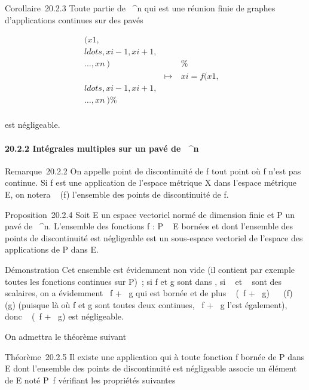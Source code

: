 Corollaire~20.2.3 Toute partie de ~^n qui est une réunion
finie de graphes d'applications continues sur des pavés

\begin{align*}
(x1,\\ldots,xi-1,xi+1,\\\ldots,xn~)&&
\%& \\ & \mapsto~&
xi =
f(x1,\\ldots,xi-1,xi+1,\\\ldots,xn~)\%&
\\ \end{align*}

est négligeable.

\paragraph{20.2.2 Intégrales multiples sur un pavé de ~^n}

Remarque~20.2.2 On appelle point de discontinuité de f tout point où f
n'est pas continue. Si f est une application de l'espace métrique X dans
l'espace métrique E, on notera
\mathrmDisc~ (f) l'ensemble
des points de discontinuité de f.

Proposition~20.2.4 Soit E un espace vectoriel normé de dimension finie
et P un pavé de ~^n. L'ensemble  des fonctions f : P \rightarrow~ E
bornées et dont l'ensemble des points de discontinuité est négligeable
est un sous-espace vectoriel de l'espace des applications de P dans E.

Démonstration Cet ensemble est évidemment non vide (il contient par
exemple toutes les fonctions continues sur P)~; si f et g sont dans ,
si \alpha~ et \beta~ sont des scalaires, on a évidemment \alpha~f + \beta~g qui est bornée et
de plus \mathrmDisc~ (\alpha~f +
\beta~g) \subset~\mathrmDisc~ (f)
\cup\mathrmDisc~ (g) (puisque
là où f et g sont toutes deux continues, \alpha~f + \beta~g l'est également), donc
\mathrmDisc~ (\alpha~f + \beta~g) est
négligeable.

On admettra le théorème suivant

Théorème~20.2.5 Il existe une application qui à toute fonction f bornée
de P dans E dont l'ensemble des points de discontinuité est négligeable
associe un élément de E noté \int  P~f
vérifiant les propriétés suivantes

